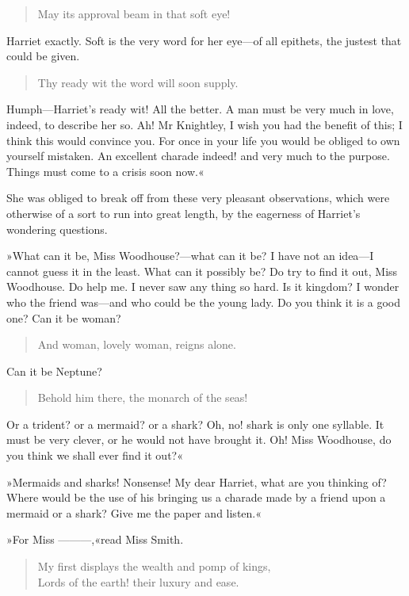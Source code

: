 \begin{quote}
May its approval beam in that soft eye!
\end{quote}


Harriet exactly. Soft is the very word for her eye—of all epithets, the justest that could be given.

\begin{quote}
Thy ready wit the word will soon supply.
\end{quote}


Humph—Harriet's ready wit! All the better. A man must be very much in love, indeed, to describe her so. Ah! Mr Knightley, I wish you had the benefit of this; I think this would convince you. For once in your life you would be obliged to own yourself mistaken. An excellent charade indeed! and very much to the purpose. Things must come to a crisis soon now.«

She was obliged to break off from these very pleasant observations, which were otherwise of a sort to run into great length, by the eagerness of Harriet's wondering questions.

»What can it be, Miss Woodhouse?—what can it be? I have not an idea—I cannot guess it in the least. What can it possibly be? Do try to find it out, Miss Woodhouse. Do help me. I never saw any thing so hard. Is it kingdom? I wonder who the friend was—and who could be the young lady. Do you think it is a good one? Can it be woman?

\begin{quote}
And woman, lovely woman, reigns alone.
\end{quote}

Can it be Neptune?

\begin{quote}
Behold him there, the monarch of the seas!
\end{quote}


Or a trident? or a mermaid? or a shark? Oh, no! shark is only one syllable. It must be very clever, or he would not have brought it. Oh! Miss Woodhouse, do you think we shall ever find it out?«

»Mermaids and sharks! Nonsense! My dear Harriet, what are you thinking of? Where would be the use of his bringing us a charade made by a friend upon a mermaid or a shark? Give me the paper and listen.«

»For Miss ———,«read Miss Smith.

\begin{verse}
\begin{altverse}
My first displays the wealth and pomp of kings,\\
    Lords of the earth! their luxury and ease.
\end{altverse}
\end{verse}

